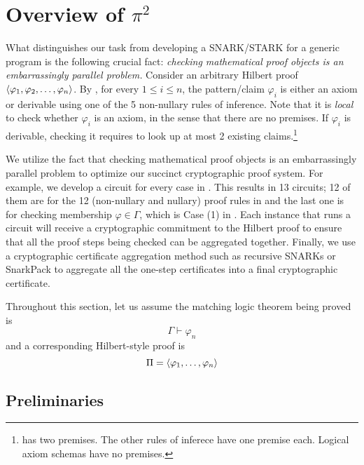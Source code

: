 \documentclass{article}
\begin{document}
\section{Overview of $\pi^2$}

What distinguishes our task from developing a SNARK/STARK for a generic program
is the following crucial fact:
\emph{checking mathematical proof objects is an embarrassingly parallel problem.} 
Consider an arbitrary Hilbert proof
$\left\langle \varphi_1,\varphi_2,\dots,\varphi_n \right\rangle$. 
By , for every $1 \le i \le n$,
the pattern/claim $\varphi_i$
is either an axiom or derivable using one of the 5 non-nullary rules of inference.
Note that it is \emph{local} to check whether $\varphi_i$ is an axiom,
in the sense that there are no premises. 
If $\varphi_i$ is derivable, checking it requires to look up at most 2 existing claims.\footnote{\pruleMP has two premises. The other rules of inferece have one premise each. Logical axiom schemas have no premises. } 

We utilize the fact that
checking mathematical proof objects is an embarrassingly parallel problem
to optimize our succinct cryptographic proof system.
For example, we develop a circuit for every case in .
This results in 13 circuits; 12 of them are for the 12 
(non-nullary and nullary) proof rules in  
and the last one is for checking membership $\varphi \in \Gamma$,
which is Case (1) in . 
Each instance that runs a circuit will receive a cryptographic commitment 
to the Hilbert proof to ensure that all the proof steps being checked
can be aggregated together. 
Finally, we use a cryptographic certificate aggregation method such as
recursive SNARKs or SnarkPack 
to aggregate all the one-step certificates into a final cryptographic certificate. 

Throughout this section, let us assume
the matching logic theorem being proved is
\begin{equation}
\label{eq:goal}
\Gamma \vdash \varphi_n
\end{equation}
and a corresponding Hilbert-style proof is
\begin{equation}
\Pi = \left\langle \varphi_1,\dots,\varphi_n \right\rangle
\end{equation}

\subsection{Preliminaries}
\end{document}
